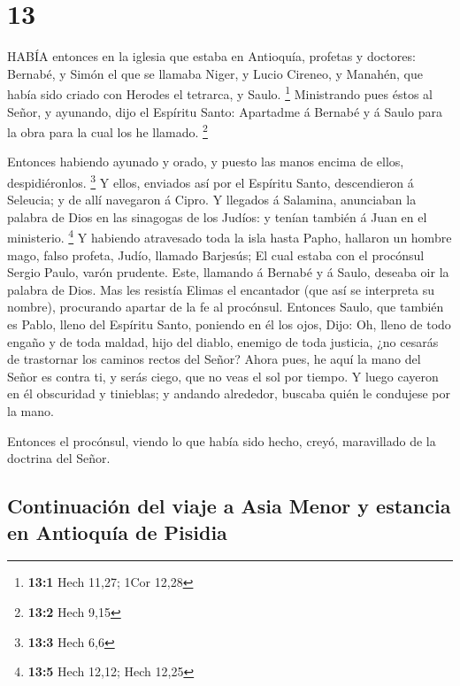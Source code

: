 \hypertarget{section-12}{%
\section{13}\label{section-12}}

 HABÍA entonces en la iglesia que estaba en Antioquía,
profetas y doctores: Bernabé, y Simón el que se llamaba Niger, y Lucio
Cireneo, y Manahén, que había sido criado con Herodes el tetrarca, y
Saulo. \footnote{\textbf{13:1} Hech 11,27; 1Cor 12,28} 
Ministrando pues éstos al Señor, y ayunando, dijo el Espíritu Santo:
Apartadme á Bernabé y á Saulo para la obra para la cual los he llamado.
\footnote{\textbf{13:2} Hech 9,15}

 Entonces habiendo ayunado y orado, y puesto las manos
encima de ellos, despidiéronlos. \footnote{\textbf{13:3} Hech 6,6}
 Y ellos, enviados así por el Espíritu Santo, descendieron á
Seleucia; y de allí navegaron á Cipro.  Y llegados á
Salamina, anunciaban la palabra de Dios en las sinagogas de los Judíos:
y tenían también á Juan en el ministerio. \footnote{\textbf{13:5} Hech
  12,12; Hech 12,25}  Y habiendo atravesado toda la isla
hasta Papho, hallaron un hombre mago, falso profeta, Judío, llamado
Barjesús;  El cual estaba con el procónsul Sergio Paulo,
varón prudente. Este, llamando á Bernabé y á Saulo, deseaba oir la
palabra de Dios.  Mas les resistía Elimas el encantador (que
así se interpreta su nombre), procurando apartar de la fe al procónsul.
 Entonces Saulo, que también es Pablo, lleno del Espíritu
Santo, poniendo en él los ojos,  Dijo: Oh, lleno de todo
engaño y de toda maldad, hijo del diablo, enemigo de toda justicia, ¿no
cesarás de trastornar los caminos rectos del Señor?  Ahora
pues, he aquí la mano del Señor es contra ti, y serás ciego, que no veas
el sol por tiempo. Y luego cayeron en él obscuridad y tinieblas; y
andando alrededor, buscaba quién le condujese por la mano.

 Entonces el procónsul, viendo lo que había sido hecho,
creyó, maravillado de la doctrina del Señor.

\hypertarget{continuaciuxf3n-del-viaje-a-asia-menor-y-estancia-en-antioquuxeda-de-pisidia}{%
\subsection{Continuación del viaje a Asia Menor y estancia en Antioquía
de
Pisidia}\label{continuaciuxf3n-del-viaje-a-asia-menor-y-estancia-en-antioquuxeda-de-pisidia}}

